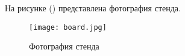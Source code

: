 На рисунке () представлена фотография стенда.
\begin{figure}[ht]
    \centering
    \texttt{[image: board.jpg]}
    \caption{Фотография стенда}
    \label{fig:mpr}
\end{figure}
